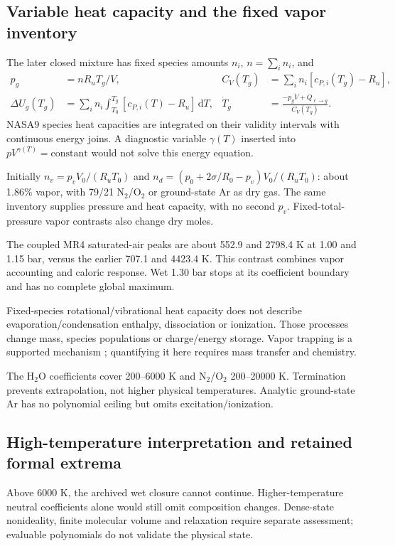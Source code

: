 \documentclass[11pt,a4paper]{article}
\newcommand{\dd}{\mathrm d}
\begin{document}
\subsection{Variable heat capacity and the fixed vapor inventory}
The later closed mixture has fixed species amounts $n_i$, $n=\sum_i n_i$, and
\begin{align}
p_g&=nR_uT_g/V,& C_V(T_g)&=\sum_i n_i[c_{P,i}(T_g)-R_u],\\
\Delta U_g(T_g)&=\sum_i n_i\int_{T_0}^{T_g}[c_{P,i}(T)-R_u]\,\dd T,&
\dot T_g&=\frac{-p_g\dot V+Q_{\ell\to g}}{C_V(T_g)}.
\end{align}
NASA9 species heat capacities \cite{nasa} are integrated on their validity intervals with continuous energy joins. A diagnostic variable $\gamma(T)$ inserted into $pV^{\gamma(T)}=\text{constant}$ would not solve this energy equation.

Initially $n_v=p_vV_0/(R_uT_0)$ and $n_d=(p_0+2\sigma/R_0-p_v)V_0/(R_uT_0)$: about 1.86\% vapor, with 79/21 N$_2$/O$_2$ or ground-state Ar as dry gas. The same inventory supplies pressure and heat capacity, with no second $p_v$. Fixed-total-pressure vapor contrasts also change dry moles.

The coupled MR4 saturated-air peaks are about 552.9 and 2798.4 K at 1.00 and 1.15 bar, versus the earlier 707.1 and 4423.4 K. This contrast combines vapor accounting and caloric response. Wet 1.30 bar stops at its coefficient boundary and has no complete global maximum.

Fixed-species rotational/vibrational heat capacity does not describe evaporation/condensation enthalpy, dissociation or ionization. Those processes change mass, species populations or charge/energy storage. Vapor trapping is a supported mechanism \cite{toegel}; quantifying it here requires mass transfer and chemistry.

The H$_2$O coefficients cover 200--6000 K and N$_2$/O$_2$ 200--20000 K. Termination prevents extrapolation, not higher physical temperatures. Analytic ground-state Ar has no polynomial ceiling but omits excitation/ionization.
\subsection{High-temperature interpretation and retained formal extrema}
Above 6000 K, the archived wet closure cannot continue. Higher-temperature neutral coefficients alone would still omit composition changes. Dense-state nonideality, finite molecular volume and relaxation require separate assessment; evaluable polynomials do not validate the physical state.
\end{document}
